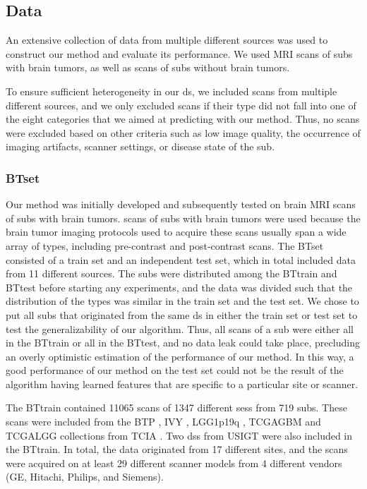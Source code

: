 \subsection{Data}

An extensive collection of data from multiple different sources was used to construct our method and evaluate its performance.
We used \gls{MRI} \glspl{scan} of \glspl{sub} with brain tumors, as well as \glspl{scan} of \glspl{sub} without brain tumors.

To ensure sufficient heterogeneity in our \gls{ds}, we included \glspl{scan} from multiple different sources, and we only excluded \glspl{scan} if their \gls{type} did not fall into one of the eight categories that we aimed at predicting with our method.
Thus, no \glspl{scan} were excluded based on other criteria such as low image quality, the occurrence of imaging artifacts, scanner settings, or disease state of the \gls{sub}.

\subsubsection{\Gls{BTset}}
Our method was initially developed and subsequently tested on brain \gls{MRI} \glspl{scan} of \glspl{sub} with brain tumors.
\Glspl{scan} of \glspl{sub} with brain tumors were used because the brain tumor imaging protocols used to acquire these \glspl{scan} usually span a wide array of \glspl{type}, including pre-contrast and post-contrast \glspl{scan}.
The \gls{BTset} consisted of a train set and an independent test set, which in total included data from 11 different sources.
The \glspl{sub} were distributed among the \gls{BTtrain} and \gls{BTtest} before starting any experiments, and the data was divided such that the distribution of the \glspl{type} was similar in the train set and the test set.
We chose to put all \glspl{sub} that originated from the same \gls{ds} in either the train set or test set to test the generalizability of our algorithm.
Thus, all \glspl{scan} of a \gls{sub} were either all in the \gls{BTtrain} or all in the \gls{BTtest}, and no data leak could take place, precluding an overly optimistic estimation of the performance of our method.
In this way, a good performance of our method on the test set could not be the result of the algorithm having learned features that are specific to a particular \gls{site} or scanner.

The \gls{BTtrain} contained 11065 \glspl{scan} of 1347 different \glspl{ses} from 719 \glspl{sub}.
These \glspl{scan} were included from the \gls{BTP} \autocite{schmainda2018radiology}, \gls{IVY} \autocite{nameeta2016radiology}, \gls{LGG1p19q} \autocite{bradley2017radiology,akkus2017predicting}, \gls{TCGAGBM} \autocite{scarpace2016radiology} and \gls{TCGALGG} \autocite{pedano2016radiology} collections from \gls{TCIA} \autocite{clark2013cancer}.
Two \glspl{ds} from \gls{USIGT} \autocite{fyllingen2016glioblastoma,xiao2017retrospective} were also included in the \gls{BTtrain}.
In total, the data originated from 17 different \glspl{site}, and the \glspl{scan} were acquired on at least 29 different scanner models from 4 different vendors (GE, Hitachi, Philips, and Siemens).

